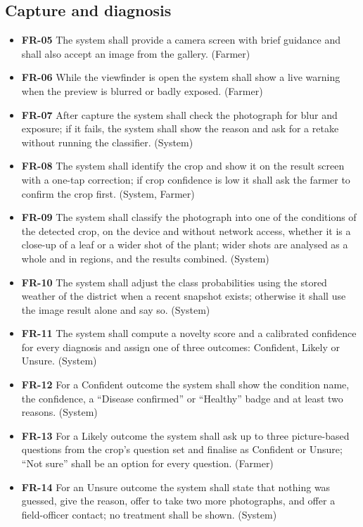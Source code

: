\subsection{Capture and diagnosis}
\begin{itemize}
  \item \textbf{FR-05} The system shall provide a camera screen with brief guidance and shall also accept an image from the gallery. (Farmer)
  \item \textbf{FR-06} While the viewfinder is open the system shall show a live warning when the preview is blurred or badly exposed. (Farmer)
  \item \textbf{FR-07} After capture the system shall check the photograph for blur and exposure; if it fails, the system shall show the reason and ask for a retake without running the classifier. (System)
  \item \textbf{FR-08} The system shall identify the crop and show it on the result screen with a one-tap correction; if crop confidence is low it shall ask the farmer to confirm the crop first. (System, Farmer)
  \item \textbf{FR-09} The system shall classify the photograph into one of the conditions of the detected crop, on the device and without network access, whether it is a close-up of a leaf or a wider shot of the plant; wider shots are analysed as a whole and in regions, and the results combined. (System)
  \item \textbf{FR-10} The system shall adjust the class probabilities using the stored weather of the district when a recent snapshot exists; otherwise it shall use the image result alone and say so. (System)
  \item \textbf{FR-11} The system shall compute a novelty score and a calibrated confidence for every diagnosis and assign one of three outcomes: Confident, Likely or Unsure. (System)
  \item \textbf{FR-12} For a Confident outcome the system shall show the condition name, the confidence, a ``Disease confirmed'' or ``Healthy'' badge and at least two reasons. (System)
  \item \textbf{FR-13} For a Likely outcome the system shall ask up to three picture-based questions from the crop's question set and finalise as Confident or Unsure; ``Not sure'' shall be an option for every question. (Farmer)
  \item \textbf{FR-14} For an Unsure outcome the system shall state that nothing was guessed, give the reason, offer to take two more photographs, and offer a field-officer contact; no treatment shall be shown. (System)
\end{itemize}
